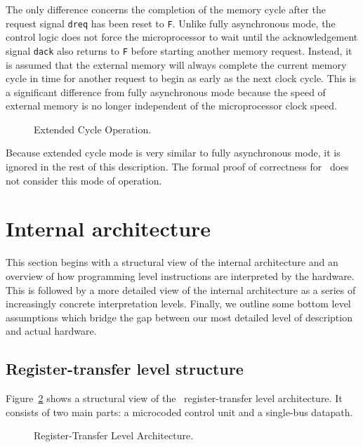 The only difference concerns the completion of the memory cycle
after the request signal \verb"dreq" has been reset to \verb"F".
Unlike fully asynchronous mode,
the control logic
does not force the microprocessor to wait until the
acknowledgement signal \verb"dack" also
returns to \verb"F" before starting another memory request.
Instead, it is assumed that
the external memory will always complete the current memory cycle
in time for another request to begin as early as the next clock cycle.
This is a significant difference from fully asynchronous mode because
the speed of external memory is no longer independent of
the microprocessor clock speed.

\begin{figure}
\begin{center}


\caption{Extended Cycle Operation.}
\label{fig-ext}
\end{center}
\end{figure}

Because extended cycle mode is very similar to fully asynchronous
mode, it is ignored in the rest of this description.
The formal proof of correctness for
\Tamarack\ does not consider this mode of operation.

\section{Internal architecture}
\label{sec-internal}

This section begins with a structural view of the internal architecture
and an overview of how programming level instructions are interpreted
by the hardware.
This is followed by a more detailed view of
the internal architecture as a series of increasingly
concrete interpretation levels.
Finally, we outline some bottom level assumptions which bridge
the gap between our most detailed level of description and actual hardware.

\subsection{Register-transfer level structure}

Figure~\ref{fig-rtl} shows a structural view of
the \Tamarack\ register-transfer level architecture.
It consists of two main parts: a microcoded control unit and
a single-bus datapath.

\begin{figure}
\begin{center}


\caption{Register-Transfer Level Architecture.}
\label{fig-rtl}
\end{center}
\end{figure}

